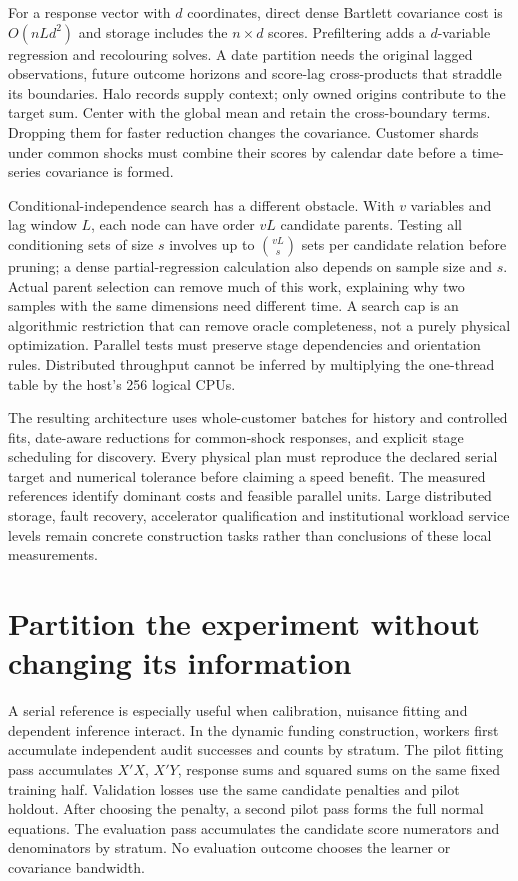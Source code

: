 For a response vector with $d$ coordinates, direct dense Bartlett covariance
cost is $O(nLd^2)$ and storage includes the $n\times d$ scores. Prefiltering
adds a $d$-variable regression and recolouring solves. A date partition needs
the original lagged observations, future outcome horizons and score-lag
cross-products that straddle its boundaries. Halo records supply context;
only owned origins contribute to the target sum. Center with the global
mean and retain the cross-boundary terms. Dropping them for faster reduction
changes the covariance. Customer shards under common shocks must combine
their scores by calendar date before a time-series covariance is formed.

Conditional-independence search has a different obstacle. With $v$ variables
and lag window $L$, each node can have order $vL$ candidate parents. Testing
all conditioning sets of size $s$ involves up to
$\binom{vL}{s}$ sets per candidate relation before pruning; a dense
partial-regression calculation also depends on sample size and $s$.
Actual parent selection can remove much of this work, explaining why two
samples with the same dimensions need different time. A search cap is an
algorithmic restriction that can remove oracle completeness, not a purely
physical optimization. Parallel tests must preserve stage dependencies and
orientation rules. Distributed throughput cannot be inferred by multiplying
the one-thread table by the host's 256 logical CPUs.

The resulting architecture uses whole-customer batches for history and
controlled fits, date-aware reductions for common-shock responses, and
explicit stage scheduling for discovery. Every physical plan must reproduce
the declared serial target and numerical tolerance before claiming a speed
benefit. The measured references identify dominant costs and feasible
parallel units. Large distributed storage, fault recovery, accelerator
qualification and institutional workload service levels remain concrete
construction tasks rather than conclusions of these local measurements.


\section{Partition the experiment without changing its information}
\label{s6:partitioned}
A serial reference is especially useful when calibration, nuisance fitting
and dependent inference interact. In the dynamic funding construction,
workers first accumulate independent audit successes and counts by stratum.
The pilot fitting pass accumulates $X'X$, $X'Y$, response sums and squared
sums on the same fixed training half. Validation losses use the same
candidate penalties and pilot holdout. After choosing the penalty, a second
pilot pass forms the full normal equations. The evaluation pass accumulates
the candidate score numerators and denominators by stratum. No evaluation
outcome chooses the learner or covariance bandwidth.

